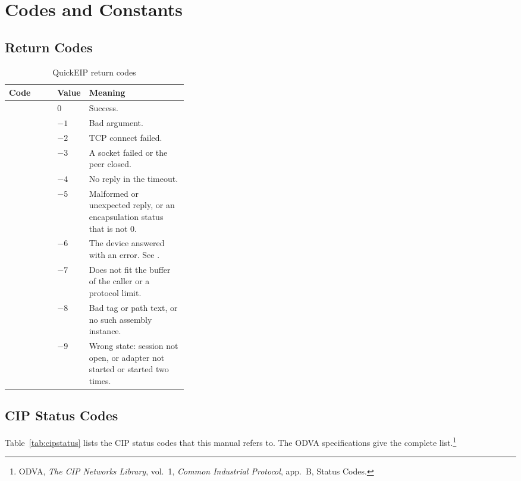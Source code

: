 \chapter{Codes and Constants}\label{app:codes}

\section{Return Codes}

\begin{table}[htbp]
\centering
\caption{QuickEIP return codes}\label{tab:retcodes}
\begin{tabularx}{\linewidth}{@{}P{0.27\linewidth}P{0.08\linewidth}L@{}}
\toprule
\textbf{Code} & \textbf{Value} & \textbf{Meaning} \\
\midrule
{} & 0 & Success. \\
 & $-1$ & Bad argument. \\
 & $-2$ & TCP connect failed. \\
 & $-3$ & A socket failed or the peer closed. \\
 & $-4$ & No reply in the timeout. \\
 & $-5$ & Malformed or unexpected reply, or an encapsulation status that is not 0. \\
 & $-6$ & The device answered with an error. See . \\
 & $-7$ & Does not fit the buffer of the caller or a protocol limit. \\
 & $-8$ & Bad tag or path text, or no such assembly instance. \\
 & $-9$ & Wrong state: session not open, or adapter not started or started two times. \\
\bottomrule
\end{tabularx}
\end{table}

\section{CIP Status Codes}

Table~\ref{tab:cipstatus} lists the CIP status codes that this manual refers
to. The ODVA specifications give the complete list.\footnote{ODVA,
\textit{The CIP Networks Library}, vol.~1, \textit{Common Industrial
Protocol}, app.~B, Status Codes.}

